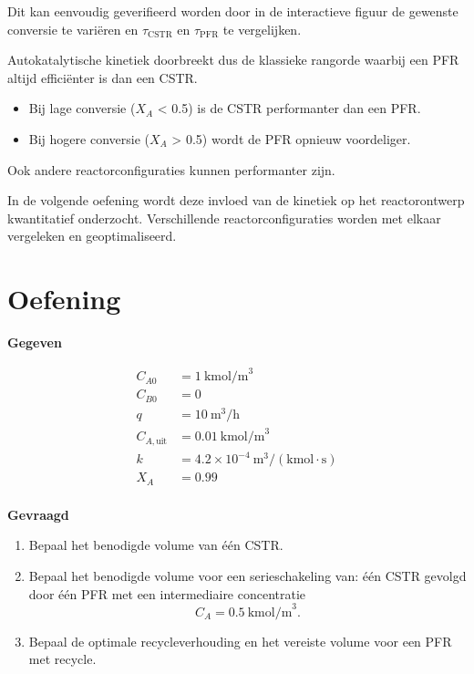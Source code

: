 \documentclass{ximera}
\begin{document}
Dit kan eenvoudig geverifieerd worden door in de
interactieve figuur de gewenste conversie te variëren
en $\tau_{\text{CSTR}}$ en $\tau_{\text{PFR}}$ te vergelijken.
\begin{center}
\end{center}

\begin{conclusion} \textbf{ }

Autokatalytische kinetiek doorbreekt dus de klassieke
rangorde waarbij een PFR altijd efficiënter is dan een CSTR. 
\begin{itemize}
\item Bij lage conversie ($X_A$ < 0.5) is de CSTR performanter dan een PFR.
\item Bij hogere conversie ($X_A$ > 0.5) wordt de PFR opnieuw voordeliger.
\end{itemize}

Ook andere reactorconfiguraties kunnen performanter zijn.
\end{conclusion}
\vspace{1cm}
In de volgende oefening wordt deze invloed van de kinetiek op het reactorontwerp kwantitatief onderzocht. Verschillende reactorconfiguraties worden met elkaar vergeleken en geoptimaliseerd.

\section*{Oefening}

\textbf{Gegeven}

\begin{align*}
C_{A0} &= 1 \ \text{kmol/m}^3 \\
C_{B0} &= 0 \\
q &= 10 \ \text{m}^3/\text{h} \\
C_{A,\text{uit}} &= 0.01 \ \text{kmol/m}^3 \\
k &= 4.2 \times 10^{-4} \ \text{m}^3/(\text{kmol}\cdot \text{s})\\
X_A &= 0.99\\
\end{align*}

\textbf{Gevraagd}
\begin{enumerate}
\renewcommand{\labelenumi}{\arabic{enumi})}
\item Bepaal het benodigde volume van één CSTR.
\item Bepaal het benodigde volume voor een serieschakeling van: één CSTR gevolgd door één PFR met een intermediaire concentratie
  \[
  C_A = 0.5 \ \text{kmol/m}^3.
  \]
\item Bepaal de optimale recycleverhouding en het vereiste volume voor een PFR met recycle.
\end{enumerate}
\end{document}
